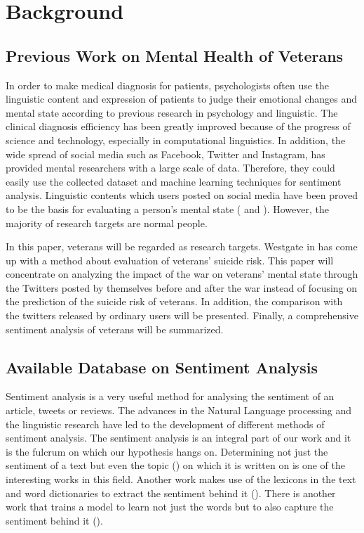 \section{Background}

\subsection{Previous Work on Mental Health of Veterans}

In order to make medical diagnosis for patients, psychologists often use the
linguistic content and expression of patients to judge their emotional changes
and mental state according to previous research in psychology and linguistic.
The clinical diagnosis efficiency has been greatly improved because of the
progress of science and technology, especially in computational linguistics.
In addition, the wide spread of social media such as Facebook, Twitter and
Instagram, has provided mental researchers with a large scale of data.
Therefore, they could easily use the collected dataset and machine learning
techniques for sentiment analysis. Linguistic contents which users posted on
social media have been proved to be the basis for evaluating a person's mental
state (\cite{becauseIwastoldsomuch} and \cite{GUNTUKU201743}). However,
the majority of research targets are normal people.

In this paper, veterans will be regarded as research targets. Westgate in
\cite{doi:10.1176/appi.ps.201400283} has come up with a method about evaluation
of veterans' suicide risk. This paper will concentrate on analyzing
the impact of the war on veterans' mental state through the Twitters posted by
themselves before and after the war instead of focusing on the prediction of
the suicide risk of veterans. In addition, the comparison with the twitters
released by ordinary users will be presented. Finally, a comprehensive
sentiment analysis of veterans will be summarized.

\subsection{Available Database on Sentiment Analysis}

Sentiment analysis is a very useful method for analysing the sentiment of an
article, tweets or reviews. The advances in the Natural Language processing and
the linguistic research have led to the development of different methods of
sentiment analysis. The sentiment analysis is an integral part of our work and
it is the fulcrum on which our hypothesis hangs on. Determining not just the
sentiment of a text but even the topic (\cite{10.1145/1645953.1646003}) on which
it is written on is one of the interesting works in this field. Another work
makes use of the lexicons in the text and word dictionaries to extract the
sentiment behind it (\cite{10.5555/2002472.2002491}). There is another work that
trains a model to learn not just the words but to also capture the sentiment
behind it (\cite{taboada2011lexicon}).

